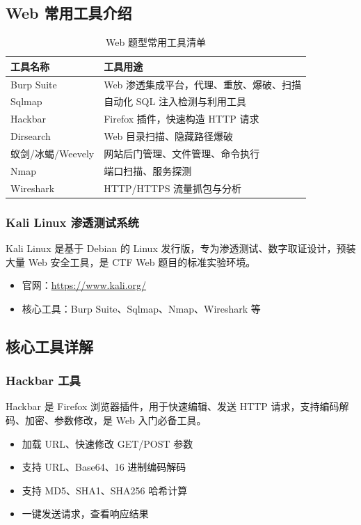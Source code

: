 \subsection{Web 常用工具介绍}
\begin{table}[htbp]
    \centering
    \caption{Web 题型常用工具清单}
    \begin{tabular}{ll}
        \toprule
        工具名称 & 工具用途 \\
        \midrule
        Burp Suite & Web 渗透集成平台，代理、重放、爆破、扫描 \\
        Sqlmap & 自动化 SQL 注入检测与利用工具 \\
        Hackbar & Firefox 插件，快速构造 HTTP 请求 \\
        Dirsearch & Web 目录扫描、隐藏路径爆破 \\
        蚁剑/冰蝎/Weevely & 网站后门管理、文件管理、命令执行 \\
        Nmap & 端口扫描、服务探测 \\
        Wireshark & HTTP/HTTPS 流量抓包与分析 \\
        \bottomrule
    \end{tabular}
\end{table}

\subsubsection{Kali Linux 渗透测试系统}
Kali Linux 是基于 Debian 的 Linux 发行版，专为渗透测试、数字取证设计，预装大量 Web 安全工具，是 CTF Web 题目的标准实验环境。
\begin{itemize}[leftmargin=*]
    \item 官网：\url{https://www.kali.org/}
    \item 核心工具：Burp Suite、Sqlmap、Nmap、Wireshark 等
\end{itemize}

\newpage
\subsection{核心工具详解}

\subsubsection{Hackbar 工具}
Hackbar 是 Firefox 浏览器插件，用于快速编辑、发送 HTTP 请求，支持编码解码、加密、参数修改，是 Web 入门必备工具。

\begin{itemize}[leftmargin=*]
    \item 加载 URL、快速修改 GET/POST 参数
    \item 支持 URL、Base64、16 进制编码解码
    \item 支持 MD5、SHA1、SHA256 哈希计算
    \item 一键发送请求，查看响应结果
\end{itemize}


